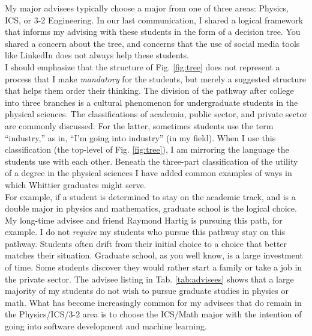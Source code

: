 \documentclass[../../main.tex]{subfiles}
\begin{document}
My major advisees typically choose a major from one of three areas: Physics, ICS, or 3-2 Engineering.  In our last communication, I shared a logical framework that informs my advising with these students in the form of a decision tree.  You shared a concern about the tree, and concerns that the use of social media tools like LinkedIn does not always help these students.
\\
\vspace{0.15cm}
I should emphasize that the structure of Fig. \ref{fig:tree} does not represent a process that I make \textit{mandatory} for the students, but merely a suggested structure that helps them order their thinking.  The division of the pathway after college into three branches is a cultural phenomenon for undergraduate students in the physical sciences.  The classifications of academia, public sector, and private sector are commonly discussed.  For the latter, sometimes students use the term ``industry,'' as in, ``I'm going into industry'' (in my field).  When I use this classification (the top-level of Fig. \ref{fig:tree}), I am mirroring the language the students use with each other.  Beneath the three-part classification of the utility of a degree in the physical sciences I have added common examples of ways in which Whittier graduates might serve.
\\
\vspace{0.15cm}
For example, if a student is determined to stay on the academic track, and is a double major in physics and mathematics, graduate school is the logical choice.  My long-time advisee and friend Raymond Hartig is pursuing this path, for example.  I do not \textit{require} my students who pursue this pathway stay on this pathway.  Students often drift from their initial choice to a choice that better matches their situation.  Graduate school, as you well know, is a large investment of time.  Some students discover they would rather start a family or take a job in the private sector.  The advisee listing in Tab. \ref{tab:advisees} shows that a large majority of my students do not wish to pursue graduate studies in physics or math.  What has become increasingly common for my advisees that do remain in the Physics/ICS/3-2 area is to choose the ICS/Math major with the intention of going into software development and machine learning.
\\
\vspace{0.15cm}
\end{document}
